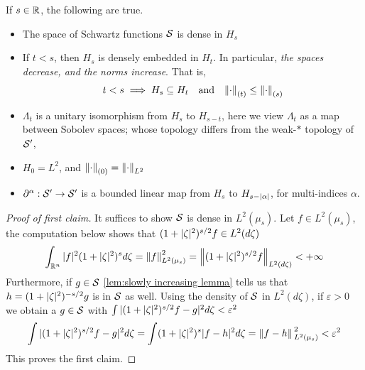 \documentclass[../main-v2-manifolds.tex]{subfiles}
\begin{document}

\begin{wts}\label{thm:key results sobolev space over complex}
If $s\in \mathbb{R}$, the following are true.
\begin{itemize}
    \item The space of Schwartz functions $\mathcal{S}$ is dense in $H_s$
    \item If $t < s$, then $H_s$ is densely embedded in $H_t$. In particular, \emph{the spaces decrease, and the norms increase}. That is,
    \[
    t<s\implies H_s\subseteq H_t\quad\text{and}\quad \norm{\cdot}_{(t)}\leq\norm{\cdot}_{(s)}
    \]
    \item $\Lambda_t$ is a unitary isomorphism from $H_s$ to $H_{s-t}$, here we view $\Lambda_t$ as a map between Sobolev spaces; whose topology differs from the weak-$\ast$ topology of $\mathcal{S}'$,
    \item $H_0 = L^2$, and $\norm{\cdot}_{(0)} = \norm{\cdot}_{L^2}$  
    \item $\partial^\alpha:\mathcal{S}'\to\mathcal{S}'$ is a bounded linear map from $H_s$ to $H_{s-\vert {\alpha} \vert}$, for multi-indices $\alpha$.
\end{itemize}
\end{wts}
\begin{proof}[Proof of first claim]
It suffices to show $\mathcal{S}$ is dense in $L^2(\mu_s)$. Let $f\in L^2(\mu_s)$, the computation below shows that $(1+\vert {\zeta} \vert^2)^{s/2}f\in L^2(d\zeta)$
\[
\int_{{\mathbb{R}^n}}\vert {f} \vert^2 (1+\vert {\zeta} \vert^2)^{s}d\zeta = \norm{f}^2_{L^2(\mu_s)} = \norm{(1+\vert {\zeta} \vert^2)^{s/2} f}_{L^2(d\zeta)}<+\infty
\]
Furthermore, if $g\in \mathcal{S}$ \cref{lem:slowly increasing lemma} tells us that $h = (1+\vert {\zeta} \vert^2)^{-s/2}g$ is in $\mathcal{S}$ as well. Using the density of $\mathcal{S}$ in $L^2(d\zeta)$, if $\varepsilon>0$ we obtain a $g\in\mathcal{S}$ with $\int \vert (1+\vert {\zeta} \vert^2)^{s/2}f - g\vert^2d\zeta < \varepsilon^2$
\[
\int \vert {(1+\vert {\zeta} \vert^2)^{s/2}f - g} \vert^2d\zeta = \int (1+\vert {\zeta} \vert^2)^{s} \vert {f-h} \vert^2 d\zeta=\norm*{f-h}_{L^2(\mu_s)}^2 < \varepsilon^2
\]
This proves the first claim. 
\end{proof}
\end{document}
